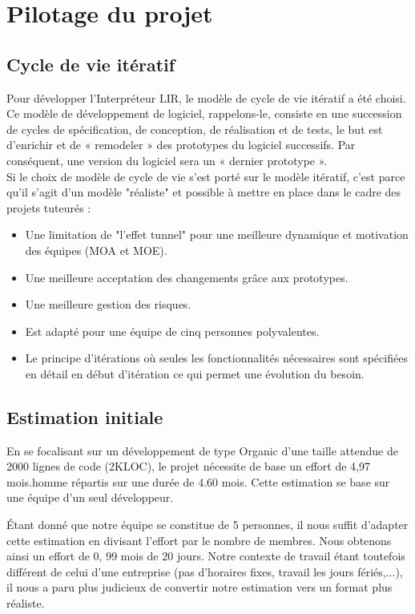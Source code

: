 \documentclass[12pt,a4paper,titlepage,openany, oneside]{report}
\begin{document}
    \chapter{Pilotage du projet}
    \section{Cycle de vie itératif}
    Pour développer l’Interpréteur LIR, le modèle de cycle de vie itératif a été
    choisi. Ce modèle de développement de logiciel, rappelons-le, consiste en une
    succession de cycles de spécification, de conception, de réalisation et de
    tests, le but est d’enrichir et de « remodeler » des prototypes du logiciel
    successifs. Par conséquent, une version du logiciel sera un « dernier
    prototype ».
    \\Si le choix de modèle de cycle de vie s'est porté sur le modèle itératif,
    c'est parce qu'il s'agit d'un modèle "réaliste" et possible à mettre en place
    dans le cadre des projets tuteurés :

    \begin{itemize}
        \item Une limitation de "l'effet tunnel" pour une meilleure dynamique et motivation des équipes (MOA et MOE).
        \item Une meilleure acceptation des changements grâce aux prototypes.
        \item Une meilleure gestion des risques.
        \item Est adapté pour une équipe de cinq personnes polyvalentes.
        \item Le principe d'itérations où seules les fonctionnalités nécessaires sont spécifiées en détail en début d'itération ce qui permet une évolution du besoin.
    \end{itemize}

    \section{Estimation initiale}
        En se focalisant sur un développement de type Organic d'une taille attendue
        de 2000 lignes de code (2KLOC), le projet nécessite de base un effort de 4,97
        mois.homme répartis sur une durée de 4.60 mois. Cette estimation se base sur
        une équipe d'un seul développeur.

        \'{E}tant donné que notre équipe se constitue de 5 personnes, il nous suffit
        d'adapter cette estimation en divisant l'effort par le nombre de membres. Nous
        obtenons ainsi un effort de 0, 99 mois de 20 jours. Notre contexte de travail
        étant toutefois différent de celui d'une entreprise (pas d'horaires fixes,
        travail les jours fériés,...), il nous a paru plus judicieux de convertir
        notre estimation vers un format plus réaliste.
\end{document}
